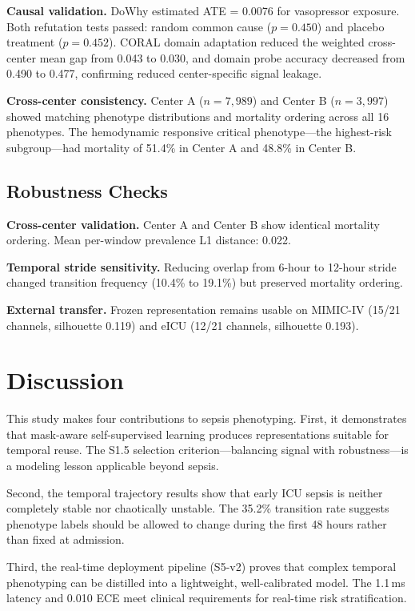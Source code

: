 \documentclass[conference,a4paper]{IEEEtran}
\begin{document}
\textbf{Causal validation.} DoWhy estimated ATE = 0.0076 for vasopressor exposure. Both refutation tests passed: random common cause ($p = 0.450$) and placebo treatment ($p = 0.452$). CORAL domain adaptation reduced the weighted cross-center mean gap from 0.043 to 0.030, and domain probe accuracy decreased from 0.490 to 0.477, confirming reduced center-specific signal leakage.

\textbf{Cross-center consistency.} Center A ($n = 7{,}989$) and Center B ($n = 3{,}997$) showed matching phenotype distributions and mortality ordering across all 16 phenotypes. The hemodynamic responsive critical phenotype---the highest-risk subgroup---had mortality of 51.4\% in Center A and 48.8\% in Center B.

\subsection{Robustness Checks}

\textbf{Cross-center validation.} Center A and Center B show identical mortality ordering. Mean per-window prevalence L1 distance: 0.022.

\textbf{Temporal stride sensitivity.} Reducing overlap from 6-hour to 12-hour stride changed transition frequency (10.4\% to 19.1\%) but preserved mortality ordering.

\textbf{External transfer.} Frozen representation remains usable on MIMIC-IV (15/21 channels, silhouette 0.119) and eICU (12/21 channels, silhouette 0.193).

\section{Discussion}

This study makes four contributions to sepsis phenotyping. First, it demonstrates that mask-aware self-supervised learning produces representations suitable for temporal reuse. The S1.5 selection criterion---balancing signal with robustness---is a modeling lesson applicable beyond sepsis.

Second, the temporal trajectory results show that early ICU sepsis is neither completely stable nor chaotically unstable. The 35.2\% transition rate suggests phenotype labels should be allowed to change during the first 48 hours rather than fixed at admission.

Third, the real-time deployment pipeline (S5-v2) proves that complex temporal phenotyping can be distilled into a lightweight, well-calibrated model. The 1.1\,ms latency and 0.010 ECE meet clinical requirements for real-time risk stratification.
\end{document}
